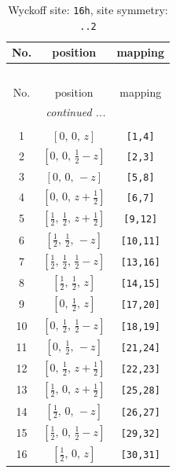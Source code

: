 \documentclass[fleqn,8pt]{jsarticle}
\begin{document}
\begin{longtable}{ccc}
\caption{Wyckoff site: {\tt 16h}, site symmetry: {\tt ..2}}
 \\
 \hline \hline
No. & position & mapping \\ \hline \endfirsthead

\multicolumn{2}{l}{\tablename\ \thetable{}} \\
 \hline \hline
No. & position & mapping \\ \hline \endhead

 \hline \hline
\multicolumn{2}{r}{\footnotesize\it continued ...} \\ \endfoot

 \hline \hline
\multicolumn{2}{r}{} \\ \endlastfoot

1 & $\left[ 0,\, 0,\, z \right]$ & {\tt [1,4]} \\ \hline
2 & $\left[ 0,\, 0,\, \frac{1}{2} - z \right]$ & {\tt [2,3]} \\ \hline
3 & $\left[ 0,\, 0,\, - z \right]$ & {\tt [5,8]} \\ \hline
4 & $\left[ 0,\, 0,\, z + \frac{1}{2} \right]$ & {\tt [6,7]} \\ \hline
5 & $\left[ \frac{1}{2},\, \frac{1}{2},\, z + \frac{1}{2} \right]$ & {\tt [9,12]} \\ \hline
6 & $\left[ \frac{1}{2},\, \frac{1}{2},\, - z \right]$ & {\tt [10,11]} \\ \hline
7 & $\left[ \frac{1}{2},\, \frac{1}{2},\, \frac{1}{2} - z \right]$ & {\tt [13,16]} \\ \hline
8 & $\left[ \frac{1}{2},\, \frac{1}{2},\, z \right]$ & {\tt [14,15]} \\ \hline
9 & $\left[ 0,\, \frac{1}{2},\, z \right]$ & {\tt [17,20]} \\ \hline
10 & $\left[ 0,\, \frac{1}{2},\, \frac{1}{2} - z \right]$ & {\tt [18,19]} \\ \hline
11 & $\left[ 0,\, \frac{1}{2},\, - z \right]$ & {\tt [21,24]} \\ \hline
12 & $\left[ 0,\, \frac{1}{2},\, z + \frac{1}{2} \right]$ & {\tt [22,23]} \\ \hline
13 & $\left[ \frac{1}{2},\, 0,\, z + \frac{1}{2} \right]$ & {\tt [25,28]} \\ \hline
14 & $\left[ \frac{1}{2},\, 0,\, - z \right]$ & {\tt [26,27]} \\ \hline
15 & $\left[ \frac{1}{2},\, 0,\, \frac{1}{2} - z \right]$ & {\tt [29,32]} \\ \hline
16 & $\left[ \frac{1}{2},\, 0,\, z \right]$ & {\tt [30,31]} \\
\end{longtable}
\end{document}
